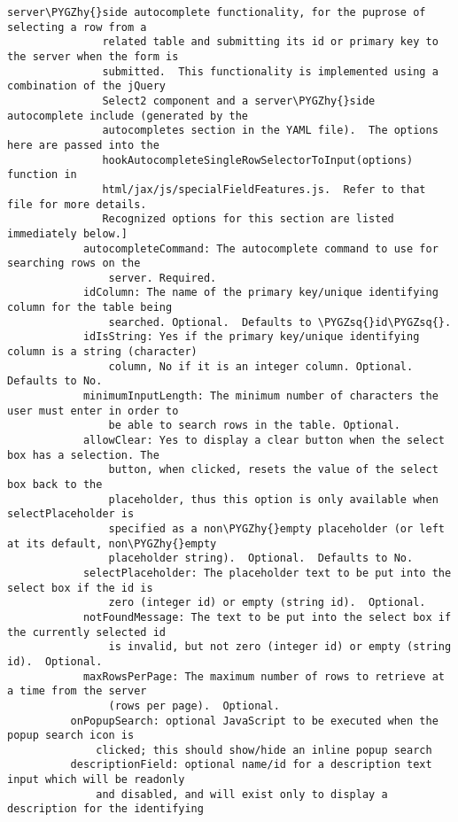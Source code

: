 \documentclass[letterpaper,10pt,english]{sphinxmanual}
\def\PYGZhy{\char`\-}
\def\PYGZsq{\char`\'}
\renewcommand\PYGZsq{\textquotesingle}
\begin{document}
\begin{Verbatim}[commandchars=\\\{\}]
               server\PYGZhy{}side autocomplete functionality, for the puprose of selecting a row from a
               related table and submitting its id or primary key to the server when the form is
               submitted.  This functionality is implemented using a combination of the jQuery
               Select2 component and a server\PYGZhy{}side autocomplete include (generated by the
               autocompletes section in the YAML file).  The options here are passed into the
               hookAutocompleteSingleRowSelectorToInput(options) function in
               html/jax/js/specialFieldFeatures.js.  Refer to that file for more details.
               Recognized options for this section are listed immediately below.]
            autocompleteCommand: The autocomplete command to use for searching rows on the
                server. Required.
            idColumn: The name of the primary key/unique identifying column for the table being
                searched. Optional.  Defaults to \PYGZsq{}id\PYGZsq{}.
            idIsString: Yes if the primary key/unique identifying column is a string (character)
                column, No if it is an integer column. Optional. Defaults to No.
            minimumInputLength: The minimum number of characters the user must enter in order to
                be able to search rows in the table. Optional.
            allowClear: Yes to display a clear button when the select box has a selection. The
                button, when clicked, resets the value of the select box back to the
                placeholder, thus this option is only available when selectPlaceholder is
                specified as a non\PYGZhy{}empty placeholder (or left at its default, non\PYGZhy{}empty
                placeholder string).  Optional.  Defaults to No.
            selectPlaceholder: The placeholder text to be put into the select box if the id is
                zero (integer id) or empty (string id).  Optional.
            notFoundMessage: The text to be put into the select box if the currently selected id
                is invalid, but not zero (integer id) or empty (string id).  Optional.
            maxRowsPerPage: The maximum number of rows to retrieve at a time from the server
                (rows per page).  Optional.
          onPopupSearch: optional JavaScript to be executed when the popup search icon is
              clicked; this should show/hide an inline popup search
          descriptionField: optional name/id for a description text input which will be readonly
              and disabled, and will exist only to display a description for the identifying

\end{Verbatim}
\end{document}
